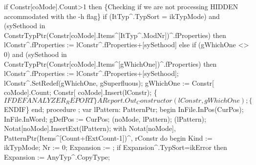    if Constr[coMode].Count>1 then \{Checking if we are not processing HIDDEN accommodated with the -h flag\}
      if (ItTyp^.TypSort = ikTypMode) and
            (sySethood in ConstrTypPtr(Constr[coMode].Items^[ItTyp^.ModNr])^.fProperties) then
         lConstr^.fProperties := lConstr^.fProperties+[sySethood]
      else if (gWhichOne <> 0) and
                 (sySethood in ConstrTypPtr(Constr[coMode].Items^[gWhichOne])^.fProperties) then
         lConstr^.fProperties := lConstr^.fProperties+[sySethood];
   lConstr^.SetRedef(gWhichOne, gSuperfluous);
   gWhichOne :=  Constr[ coMode].Count;
   Constr[ coMode].Insert(lConstr);
   \{$IFDEF ANALYZER_REPORT\}
   AReport.Out_Constructor(lConstr, gWhichOne);
   \{$ENDIF\}
end;
\eatline
{}\nwendcode{}\nwdocspar
\nwenddocs{}\endmoddef\nwstartdeflinemarkup{}\nwenddeflinemarkup
procedure ;
var
   lPattern: PatternPtr;
begin
   InFile.InPos(CurPos);
   InFile.InWord;
   gDefPos := CurPos;
   (noMode, lPattern);
   (lPattern);
   Notat[noMode].InsertExt(lPattern);
   with Notat[noMode], PatternPtr(Items^[Count+fExtCount-1])^, rConstr do
   begin
      Kind := ikTypMode;
      Nr := 0;
      Expansion := ;
      if Expansion^.TypSort=ikError then Expansion := AnyTyp^.CopyType;
